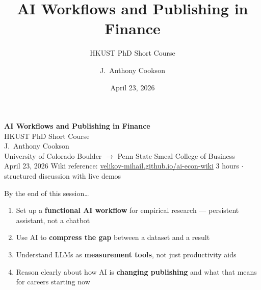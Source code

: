 \documentclass[aspectratio=169, 10pt]{beamer}
\title{AI Workflows and Publishing in Finance}
\subtitle{HKUST PhD Short Course}
\author{J.\ Anthony Cookson}
\institute{Penn State Smeal College of Business}
\date{April 23, 2026}
\begin{document}

{%
\begin{frame}[plain]
  \vspace{1.5em}
  {\color{white}\Large\bfseries AI Workflows and Publishing in Finance}\\[0.5em]
  {\color{white!70}\large HKUST PhD Short Course}\\[1.5em]
  {\color{white!90} J.\ Anthony Cookson}\\
  {\color{white!70}\small University of Colorado Boulder $\rightarrow$ Penn State Smeal College of Business}\\[0.3em]
  {\color{white!70}\small April 23, 2026}
  \vfill
  {\color{white!50}\footnotesize
    Wiki reference: \href{https://velikov-mihail.github.io/ai-econ-wiki/}{velikov-mihail.github.io/ai-econ-wiki}
    \hfill 3 hours $\cdot$ structured discussion with live demos}
\end{frame}
}

\begin{frame}{By the end of this session\ldots}
  \begin{enumerate}
    \setlength{\itemsep}{0.7em}
    \item Set up a \textbf{functional AI workflow} for empirical research ---
          persistent assistant, not a chatbot
    \item Use AI to \textbf{compress the gap} between a dataset and a result
    \item Understand LLMs as \textbf{measurement tools}, not just productivity aids
    \item Reason clearly about how AI is \textbf{changing publishing} and
          what that means for careers starting now
  \end{enumerate}
\end{frame}
\end{document}
